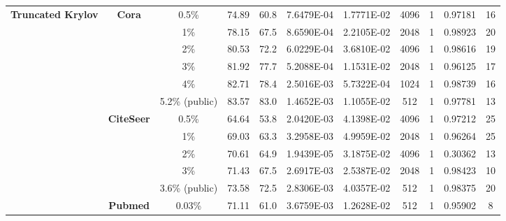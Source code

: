 \begin{table}[htbp]
\begin{tabular}{ccccc|cccccc}
    \midrule
    \multirow{15}[2]{*}{\textbf{Truncated Krylov}} & \multirow{6}[1]{*}{\textbf{Cora}} & 0.5\% & \cellcolor[rgb]{ .388,  .745,  .482}74.89 & \cellcolor[rgb]{ .973,  .412,  .42}60.8 & 7.6479E-04 & 1.7771E-02 & 4096  & 1     & 0.97181 & 16 \\
          &       & 1\%   & \cellcolor[rgb]{ .388,  .745,  .482}78.15 & \cellcolor[rgb]{ .973,  .412,  .42}67.5 & 8.6590E-04 & 2.2105E-02 & 2048  & 1     & 0.98923 & 20 \\
          &       & 2\%   & \cellcolor[rgb]{ .388,  .745,  .482}80.53 & \cellcolor[rgb]{ .973,  .412,  .42}72.2 & 6.0229E-04 & 3.6810E-02 & 4096  & 1     & 0.98616 & 19 \\
          &       & 3\%   & \cellcolor[rgb]{ .388,  .745,  .482}81.92 & \cellcolor[rgb]{ .973,  .412,  .42}77.7 & 5.2088E-04 & 1.1531E-02 & 2048  & 1     & 0.96125 & 17 \\
          &       & 4\%   & \cellcolor[rgb]{ .388,  .745,  .482}82.71 & \cellcolor[rgb]{ .973,  .412,  .42}78.4 & 2.5016E-03 & 5.7322E-04 & 1024  & 1     & 0.98739 & 16 \\
          &       & 5.2\% (public) & \cellcolor[rgb]{ .388,  .745,  .482}83.57 & \cellcolor[rgb]{ .973,  .412,  .42}83.0 & 1.4652E-03 & 1.1055E-02 & 512   & 1     & 0.97781 & 13 \\
          & \multirow{5}[0]{*}{\textbf{CiteSeer}} & 0.5\% & \cellcolor[rgb]{ .388,  .745,  .482}64.64 & \cellcolor[rgb]{ .973,  .412,  .42}53.8 & 2.0420E-03 & 4.1398E-02 & 4096  & 1     & 0.97212 & 25 \\
          &       & 1\%   & \cellcolor[rgb]{ .388,  .745,  .482}69.03 & \cellcolor[rgb]{ .973,  .412,  .42}63.3 & 3.2958E-03 & 4.9959E-02 & 2048  & 1     & 0.96264 & 25 \\
          &       & 2\%   & \cellcolor[rgb]{ .388,  .745,  .482}70.61 & \cellcolor[rgb]{ .973,  .412,  .42}64.9 & 1.9439E-05 & 3.1875E-02 & 4096  & 1     & 0.30362 & 13 \\
          &       & 3\%   & \cellcolor[rgb]{ .388,  .745,  .482}71.43 & \cellcolor[rgb]{ .973,  .412,  .42}67.5 & 2.6917E-03 & 2.5387E-02 & 2048  & 1     & 0.98423 & 10 \\
          &       & 3.6\% (public) & \cellcolor[rgb]{ .388,  .745,  .482}73.58 & \cellcolor[rgb]{ .973,  .412,  .42}72.5 & 2.8306E-03 & 4.0357E-02 & 512   & 1     & 0.98375 & 20 \\
          & \multirow{4}[1]{*}{\textbf{Pubmed}} & 0.03\% & \cellcolor[rgb]{ .388,  .745,  .482}71.11 & \cellcolor[rgb]{ .973,  .412,  .42}61.0 & 3.6759E-03 & 1.2628E-02 & 512   & 1     & 0.95902 & 8 \\

\end{tabular}
\end{table}
